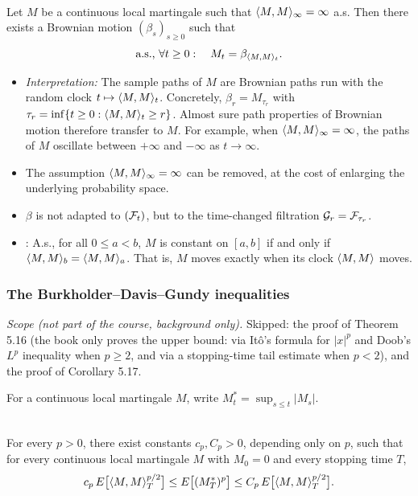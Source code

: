 \begin{theorem}\label{chap5.3.2:theorem-DDS}
\\
Let $M$ be a continuous local martingale such that $\langle M,M\rangle_\infty=\infty$ a.s. Then there exists a Brownian motion $(\beta_s)_{s\geq0}$ such that
$$\text{a.s., }\forall t\geq0:\quad M_t=\beta_{\langle M,M\rangle_t}.$$
\end{theorem}

\begin{remark}\label{chap5.3.2:remark-DDS}
\begin{itemize}
    \item \textit{Interpretation:} The sample paths of $M$ are Brownian paths run with the random clock $t\mapsto\langle M,M\rangle_t$. Concretely, $\beta_r=M_{\tau_r}$ with $\tau_r=\inf\{t\geq0:\langle M,M\rangle_t\geq r\}$. Almost sure path properties of Brownian motion therefore transfer to $M$. For example, when $\langle M,M\rangle_\infty=\infty$, the paths of $M$ oscillate between $+\infty$ and $-\infty$ as $t\to\infty$.
    \item The assumption $\langle M,M\rangle_\infty=\infty$ can be removed, at the cost of enlarging the underlying probability space.
    \item $\beta$ is not adapted to $(\mathcal{F}_t)$, but to the time-changed filtration $\mathcal{G}_r=\mathcal{F}_{\tau_r}$.
    \item {}: A.s., for all $0\leq a<b$, $M$ is constant on $[a,b]$ if and only if $\langle M,M\rangle_b=\langle M,M\rangle_a$. That is, $M$ moves exactly when its clock $\langle M,M\rangle$ moves.
\end{itemize}
\end{remark}

\subsubsection{The Burkholder--Davis--Gundy inequalities}
\noindent\textit{Scope (not part of the course, background only).} Skipped: the proof of Theorem 5.16 (the book only proves the upper bound: via Itô's formula for $|x|^p$ and Doob's $L^p$ inequality when $p\geq2$, and via a stopping-time tail estimate when $p<2$), and the proof of Corollary 5.17.

For a continuous local martingale $M$, write $M^*_t=\sup_{s\leq t}|M_s|$.

\begin{theorem}\label{chap5.3.3:theorem-BDG}
\\
For every $p>0$, there exist constants $c_p,C_p>0$, depending only on $p$, such that for every continuous local martingale $M$ with $M_0=0$ and every stopping time $T$,
$$c_p\,E\big[\langle M,M\rangle_T^{p/2}\big]\leq E\big[(M^*_T)^p\big]\leq C_p\,E\big[\langle M,M\rangle_T^{p/2}\big].$$
\end{theorem}

